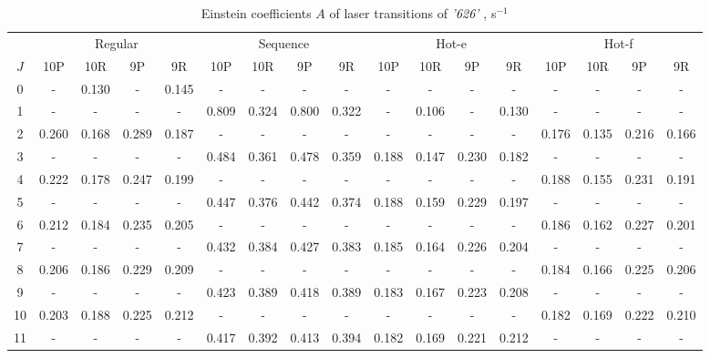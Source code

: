 \documentclass{report}
\begin{document}
\begin{appendices}
\begin{table}
\centering
\caption{Einstein coefficients $A$ of laser transitions of \textit{'626'} , s$^{-1}$}
\label{table:A626}
\scriptsize
\begin{tabular}{|c|cccc|cccc|cccc|cccc|}
\hline
& \multicolumn{4}{c|}{Regular}& \multicolumn{4}{c|}{Sequence}& \multicolumn{4}{c|}{Hot-e}& \multicolumn{4}{c|}{Hot-f}\\
$J$ & 10P & 10R & 9P & 9R & 10P & 10R & 9P & 9R & 10P & 10R & 9P & 9R & 10P & 10R & 9P & 9R\\ 
\hline
0  &   -   & 0.130 &   -   & 0.145 &   -   &   -   &   -   &   -   &   -   &   -   &   -   &   -   &   -   &   -   &   -   &   -  \\
1  &   -   &   -   &   -   &   -   & 0.809 & 0.324 & 0.800 & 0.322 &   -   & 0.106 &   -   & 0.130 &   -   &   -   &   -   &   -  \\
2  & 0.260 & 0.168 & 0.289 & 0.187 &   -   &   -   &   -   &   -   &   -   &   -   &   -   &   -   & 0.176 & 0.135 & 0.216 & 0.166\\
3  &   -   &   -   &   -   &   -   & 0.484 & 0.361 & 0.478 & 0.359 & 0.188 & 0.147 & 0.230 & 0.182 &   -   &   -   &   -   &   -  \\
4  & 0.222 & 0.178 & 0.247 & 0.199 &   -   &   -   &   -   &   -   &   -   &   -   &   -   &   -   & 0.188 & 0.155 & 0.231 & 0.191\\
5  &   -   &   -   &   -   &   -   & 0.447 & 0.376 & 0.442 & 0.374 & 0.188 & 0.159 & 0.229 & 0.197 &   -   &   -   &   -   &   -  \\
6  & 0.212 & 0.184 & 0.235 & 0.205 &   -   &   -   &   -   &   -   &   -   &   -   &   -   &   -   & 0.186 & 0.162 & 0.227 & 0.201\\
7  &   -   &   -   &   -   &   -   & 0.432 & 0.384 & 0.427 & 0.383 & 0.185 & 0.164 & 0.226 & 0.204 &   -   &   -   &   -   &   -  \\
8  & 0.206 & 0.186 & 0.229 & 0.209 &   -   &   -   &   -   &   -   &   -   &   -   &   -   &   -   & 0.184 & 0.166 & 0.225 & 0.206\\
9  &   -   &   -   &   -   &   -   & 0.423 & 0.389 & 0.418 & 0.389 & 0.183 & 0.167 & 0.223 & 0.208 &   -   &   -   &   -   &   -  \\
10 & 0.203 & 0.188 & 0.225 & 0.212 &   -   &   -   &   -   &   -   &   -   &   -   &   -   &   -   & 0.182 & 0.169 & 0.222 & 0.210\\
11 &   -   &   -   &   -   &   -   & 0.417 & 0.392 & 0.413 & 0.394 & 0.182 & 0.169 & 0.221 & 0.212 &   -   &   -   &   -   &   -  \\

\end{tabular}
\end{table}
\end{appendices}
\end{document}
